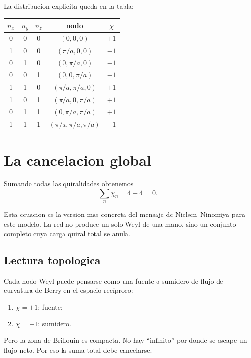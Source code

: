 La distribucion explicita queda en la tabla:

\begin{center}
\begin{tabular}{ccc c c}
\toprule
\(n_x\) & \(n_y\) & \(n_z\) & nodo & \(\chi\) \\
\midrule
0 & 0 & 0 & \((0,0,0)\) & \(+1\) \\
1 & 0 & 0 & \((\pi/a,0,0)\) & \(-1\) \\
0 & 1 & 0 & \((0,\pi/a,0)\) & \(-1\) \\
0 & 0 & 1 & \((0,0,\pi/a)\) & \(-1\) \\
1 & 1 & 0 & \((\pi/a,\pi/a,0)\) & \(+1\) \\
1 & 0 & 1 & \((\pi/a,0,\pi/a)\) & \(+1\) \\
0 & 1 & 1 & \((0,\pi/a,\pi/a)\) & \(+1\) \\
1 & 1 & 1 & \((\pi/a,\pi/a,\pi/a)\) & \(-1\) \\
\bottomrule
\end{tabular}
\end{center}

\section{La cancelacion global}
Sumando todas las quiralidades obtenemos
\begin{equation}
\sum_n \chi_n = 4 - 4 = 0.
\label{c27:eq:sumzero}
\end{equation}

Esta ecuacion es la version mas concreta del mensaje de Nielsen--Ninomiya para este modelo. La red no produce un solo Weyl de una mano, sino un conjunto completo cuya carga quiral total se anula.

\subsection{Lectura topologica}
Cada nodo Weyl puede pensarse como una fuente o sumidero de flujo de curvatura de Berry en el espacio recíproco:
\begin{enumerate}[label=\arabic*.]
    \item \(\chi=+1\): fuente;
    \item \(\chi=-1\): sumidero.
\end{enumerate}

Pero la zona de Brillouin es compacta. No hay \enquote{infinito} por donde se escape un flujo neto. Por eso la suma total debe cancelarse.

